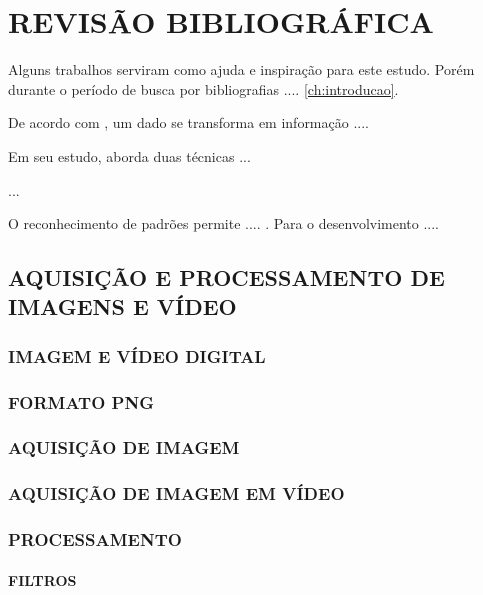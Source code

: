 
\chapter{REVISÃO BIBLIOGRÁFICA}\label{ch:rev-bibs}

Alguns trabalhos serviram como ajuda e inspiração para este estudo. Porém durante o período de busca por bibliografias .... \autoref{ch:introducao}.

De acordo com , um dado se transforma em informação ....

Em seu estudo,  aborda duas técnicas ...

...

O reconhecimento de padrões permite ....  \cite{logs-web}. Para o desenvolvimento ....


\section{AQUISIÇÃO E PROCESSAMENTO DE IMAGENS E VÍDEO}\label{sec:processamento_imagens}


\subsection{IMAGEM E VÍDEO DIGITAL}\label{subsec:imagem}

\subsection{FORMATO PNG}\label{subsec:png}

\subsection{AQUISIÇÃO DE IMAGEM}\label{subsec:aquisicao_img}

\subsection{AQUISIÇÃO DE IMAGEM EM VÍDEO}\label{subsec:aquisicao_video}

\subsection{PROCESSAMENTO}\label{subsec:processamento}

\subsubsection{FILTROS}\label{subsubsec:filtros}

